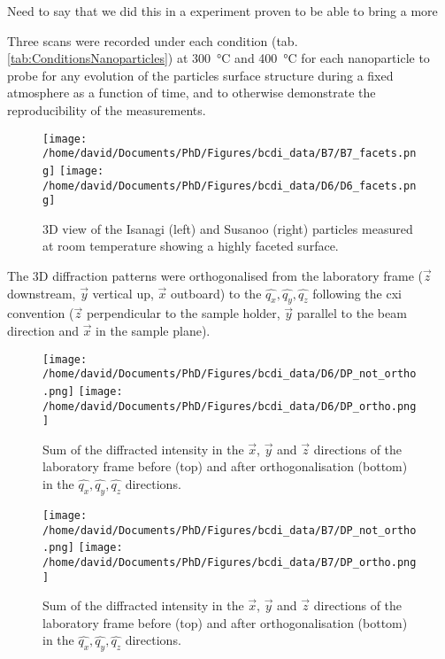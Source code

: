 \textcolor{Important}{Need to say that we did this in a experiment}
proven to be able to bring a more

Three scans were recorded under each condition (tab. \ref{tab:ConditionsNanoparticles}) at \qty{300}{\degreeCelsius} and \qty{400}{\degreeCelsius} for each nanoparticle to probe for any evolution of the particles surface structure during a fixed atmosphere as a function of time, and to otherwise demonstrate the reproducibility of the measurements.

\begin{figure}[!htb]
    \centering
    \texttt{[image: /home/david/Documents/PhD/Figures/bcdi\_data/B7/B7\_facets.png]}
    \texttt{[image: /home/david/Documents/PhD/Figures/bcdi\_data/D6/D6\_facets.png]}
    \caption{
        3D view of the Isanagi (left) and Susanoo (right) particles measured at room temperature showing a highly faceted surface.
    }
    \label{fig:IsanagiSusanooFacets}
\end{figure}

The 3D diffraction patterns were orthogonalised from the laboratory frame ($\vec{z}$ downstream, $\vec{y}$ vertical up, $\vec{x}$ outboard) to the $\hat{q_x}, \hat{q_y}, \hat{q_z}$ following the cxi convention ($\vec{z}$ perpendicular to the sample holder, $\vec{y}$ parallel to the beam direction and $\vec{x}$ in the sample plane).

\begin{figure}[!htb]
    \centering
    \texttt{[image: /home/david/Documents/PhD/Figures/bcdi\_data/D6/DP\_not\_ortho.png]}
    \texttt{[image: /home/david/Documents/PhD/Figures/bcdi\_data/D6/DP\_ortho.png]}
    \caption{
        Sum of the diffracted intensity in the $\vec{x}$, $\vec{y}$ and $\vec{z}$ directions of the laboratory frame before (top) and after orthogonalisation (bottom) in the $\hat{q_x}, \hat{q_y}, \hat{q_z}$ directions.
    }
    \label{fig:IsanagiOrtho}
\end{figure}

\begin{figure}[!htb]
    \centering
    \texttt{[image: /home/david/Documents/PhD/Figures/bcdi\_data/B7/DP\_not\_ortho.png]}
    \texttt{[image: /home/david/Documents/PhD/Figures/bcdi\_data/B7/DP\_ortho.png]}
    \caption{
        Sum of the diffracted intensity in the $\vec{x}$, $\vec{y}$ and $\vec{z}$ directions of the laboratory frame before (top) and after orthogonalisation (bottom) in the $\hat{q_x}, \hat{q_y}, \hat{q_z}$ directions.
    }
    \label{fig:SusanooOrtho}
\end{figure}


